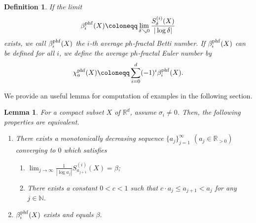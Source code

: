 \documentclass[12pt]{amsart}
\numberwithin{equation}{section}
\newtheorem{lem}[thm]{\bf Lemma}
\newtheorem{dfn}[thm]{\bf Definition}
\begin{document}
\begin{dfn}
    If the limit
    \begin{equation*}
        \beta_i^{\rm phf}(X) \coloneqq \lim_{\delta \searrow 0} \frac{S_\delta^{(i)}(X)}{|\log \delta|} 
    \end{equation*}
    exists, we call $\beta_i^{\rm phf}(X)$ the $i$-th average $ph$-fractal Betti number. 
    If $\beta_i^{\rm phf}(X)$ can be defined for all $i$, we define the average $ph$-fractal Euler number by
    \begin{equation*}
        \chi_{a}^{\rm phf}(X) \coloneqq \sum_{i=0}^{d} (-1)^i \beta_i^{\rm phf}(X).
    \end{equation*}
    \label{def:ph-fractal-betti-number}
\end{dfn}

We provide an useful lemma for computation of examples in the following section.

\begin{lem}
  For a compact subset $X$ of $\mathbb{R}^d$, assume $\sigma_i \neq 0$. 
  Then, the following properties are equivalent. 
  \begin{enumerate}
    \item There exists a monotonically decreasing sequence $\{a_j\}_{j=1}^\infty$ $(a_j \in \mathbb{R}_{>0})$ converging to $0$ which satisfies 
    \begin{enumerate}
      \item $\displaystyle \lim_{j \rightarrow \infty} \frac{1}{ \left| \log a_j\right|}S_{a_{j+1}}^{(i)}(X) = \beta$; 
      \item There exists a constant $0 < c < 1$ such that $c \cdot a_j \leq a_{j+1} < a_j$ for any $j\in \mathbb{N}$.
    \end{enumerate}
    \item $\beta_i ^{\rm phf} (X)$ exists and equals $\beta$.
  \end{enumerate}
  \label{lem: the existence of average ph fractal Betti number}
\end{lem}
\end{document}
